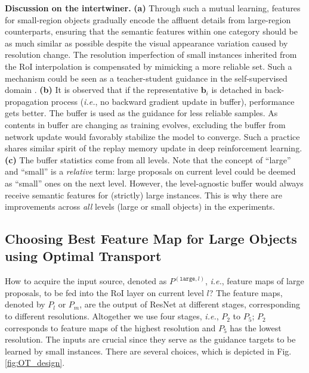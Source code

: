 \documentclass{article} \usepackage{iclr2019_conference,times}
\begin{document}
\textbf{Discussion on the intertwiner.} \textbf{(a)} Through such a mutual learning, features for small-region objects gradually encode the affluent details from large-region counterparts, ensuring that the semantic features within one category should be as much similar as possible despite the visual appearance variation caused by resolution change. 
The resolution imperfection of small instances inherited from the RoI interpolation is compensated by mimicking a more reliable set. 
Such a mechanism could be seen as a teacher-student guidance in the self-supervised domain \citep{chen2017_obj_det_data_dis}.
\textbf{(b)} 
It is observed that if the representative $\bm{b}_i$ is detached in back-propagation process {(\textit{i.e.}, no backward gradient update in buffer)},  performance gets better. The buffer is used as the guidance for less reliable samples.
As contents in buffer are changing as training evolves, excluding the buffer from network update would favorably stabilize the model to converge. 
Such a practice shares similar spirit of the replay memory update in deep reinforcement learning.
\textbf{(c)} The buffer statistics come from all levels. Note that the concept of ``large'' and ``small'' is a \textit{relative} term: large proposals on current level could be deemed as ``small'' ones on the next level. However, the level-agnostic buffer would always receive semantic features for (strictly) large instances. 
This is why there are improvements across \textit{all} levels (large or small objects) in the experiments.


\subsection{Choosing Best Feature Map for Large Objects using Optimal Transport }\label{sec:optimal-transport-divergence-as-information-alignment}

How to acquire the input source, 
denoted as $P^{(\texttt{large}, l)}$, \textit{i.e.}, feature maps of large proposals, to be fed into the RoI layer on current level $l$? 
The feature maps, denoted by $P_l$ or $P_m$, are the output of ResNet at different stages, corresponding to different resolutions. Altogether we use four stages, \textit{i.e.}, $P_2$ to $P_5$; $P_2$ corresponds to feature maps of the highest resolution and $P_5$ has the lowest resolution.
The inputs are crucial since they serve as the guidance targets to be learned by small instances. 
There are several choices, which is depicted in Fig. \ref{fig:OT_design}.
\end{document}
